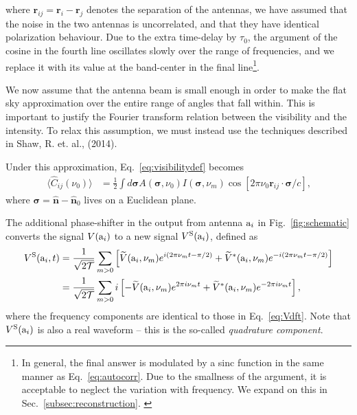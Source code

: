 \documentclass[11pt]{article}
\numberwithin{equation}{section}
\newcommand{\bt}[1]{\mathbf{#1}}
\newcommand{\wt}[1]{\widetilde{#1}}
\begin{document}
where $\bt r_{ij} = \bt r_i - \bt r_j$ denotes the separation of the antennas, we have assumed that the noise in the two antennas is uncorrelated, and that they have identical polarization behaviour. Due to the extra time-delay by $\tau_0$, the argument of the cosine in the fourth line oscillates slowly over the range of frequencies, and we replace it with its value at the band-center in the final line\footnote{In general, the final answer is modulated by a sinc function in the same manner as Eq.~\eqref{eq:autocorr}. Due to the smallness of the argument, it is acceptable to neglect the variation with frequency. We expand on this in Sec.~\ref{subsec:reconstruction}. \label{fn:bw}}.

We now assume that the antenna beam is small enough in order to make the flat sky approximation over the entire range of angles that fall within. This is important to justify the Fourier transform relation between the visibility and the intensity. To relax this assumption, we must instead use the techniques described in Shaw, R. et. al., (2014).

Under this approximation, Eq.~\eqref{eq:visibilitydef} becomes 
\begin{align}
  \langle \hat{C}_{ij}(\nu_0) \rangle & = \frac12 \int d \bm{\sigma} A(\bm \sigma, \nu_0) I(\bm \sigma, \nu_m)  \cos{\left[ 2\pi \nu_{0} \bt r_{ij} \cdot \bm \sigma/c \right]} \mbox{,} \label{eq:visibilityflat}
\end{align}
where $\bm \sigma = \hat{\bt n} - \hat{\bt n}_0$ lives on a Euclidean plane.

The additional phase-shifter in the output from antenna ${\rm a}_i$ in Fig.~\ref{fig:schematic} converts the signal $V({\rm a}_i)$ to a new signal $V^{\rm S}({\rm a}_i)$, defined as
\begin{align}
    V^{\rm S}({\rm a}_i, t) & = \frac{1}{\sqrt{2 \cal T}} \sum_{m > 0} \left[ \wt{V}({\rm a}_i, \nu_m) e^{i(2\pi  \nu_m t - \pi/2)} + \wt{V}^\ast({\rm a}_i, \nu_m) e^{-i(2\pi \nu_m t - \pi/2)} \right] \\ 
    & = \frac{1}{\sqrt{2 \cal T}} \sum_{m > 0} i \left[ - \wt{V}({\rm a}_i, \nu_m) e^{2\pi i \nu_m t} + \wt{V}^\ast({\rm a}_i, \nu_m) e^{- 2\pi i \nu_m t} \right] \mbox{,} \label{eq:VSdef}
\end{align}
where the frequency components are identical to those in Eq.~\eqref{eq:Vdft}. Note that $V^{\rm S}({\rm a}_i)$ is also a real waveform -- this is the so-called {\em quadrature component}. 
\end{document}
